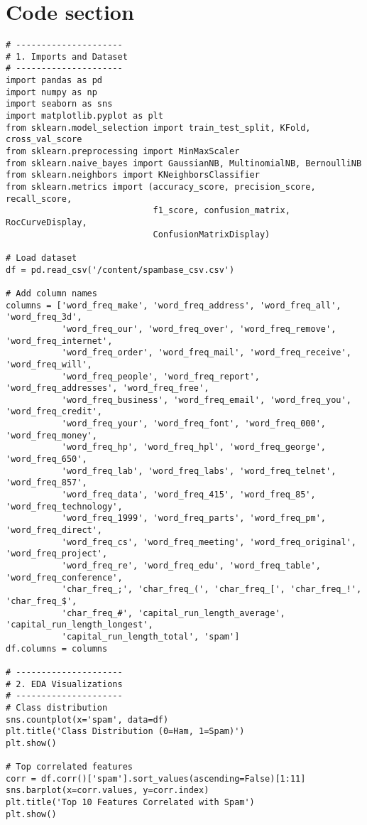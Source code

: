 \documentclass[12pt]{article}
\begin{document}
\section*{Code section}
\begin{verbatim}
# ---------------------
# 1. Imports and Dataset
# ---------------------
import pandas as pd
import numpy as np
import seaborn as sns
import matplotlib.pyplot as plt
from sklearn.model_selection import train_test_split, KFold, cross_val_score
from sklearn.preprocessing import MinMaxScaler
from sklearn.naive_bayes import GaussianNB, MultinomialNB, BernoulliNB
from sklearn.neighbors import KNeighborsClassifier
from sklearn.metrics import (accuracy_score, precision_score, recall_score,
                             f1_score, confusion_matrix, RocCurveDisplay,
                             ConfusionMatrixDisplay)

# Load dataset
df = pd.read_csv('/content/spambase_csv.csv')

# Add column names
columns = ['word_freq_make', 'word_freq_address', 'word_freq_all', 'word_freq_3d',
           'word_freq_our', 'word_freq_over', 'word_freq_remove', 'word_freq_internet',
           'word_freq_order', 'word_freq_mail', 'word_freq_receive', 'word_freq_will',
           'word_freq_people', 'word_freq_report', 'word_freq_addresses', 'word_freq_free',
           'word_freq_business', 'word_freq_email', 'word_freq_you', 'word_freq_credit',
           'word_freq_your', 'word_freq_font', 'word_freq_000', 'word_freq_money',
           'word_freq_hp', 'word_freq_hpl', 'word_freq_george', 'word_freq_650',
           'word_freq_lab', 'word_freq_labs', 'word_freq_telnet', 'word_freq_857',
           'word_freq_data', 'word_freq_415', 'word_freq_85', 'word_freq_technology',
           'word_freq_1999', 'word_freq_parts', 'word_freq_pm', 'word_freq_direct',
           'word_freq_cs', 'word_freq_meeting', 'word_freq_original', 'word_freq_project',
           'word_freq_re', 'word_freq_edu', 'word_freq_table', 'word_freq_conference',
           'char_freq_;', 'char_freq_(', 'char_freq_[', 'char_freq_!', 'char_freq_$',
           'char_freq_#', 'capital_run_length_average', 'capital_run_length_longest',
           'capital_run_length_total', 'spam']
df.columns = columns

# ---------------------
# 2. EDA Visualizations
# ---------------------
# Class distribution
sns.countplot(x='spam', data=df)
plt.title('Class Distribution (0=Ham, 1=Spam)')
plt.show()

# Top correlated features
corr = df.corr()['spam'].sort_values(ascending=False)[1:11]
sns.barplot(x=corr.values, y=corr.index)
plt.title('Top 10 Features Correlated with Spam')
plt.show()


\end{verbatim}
\end{document}
